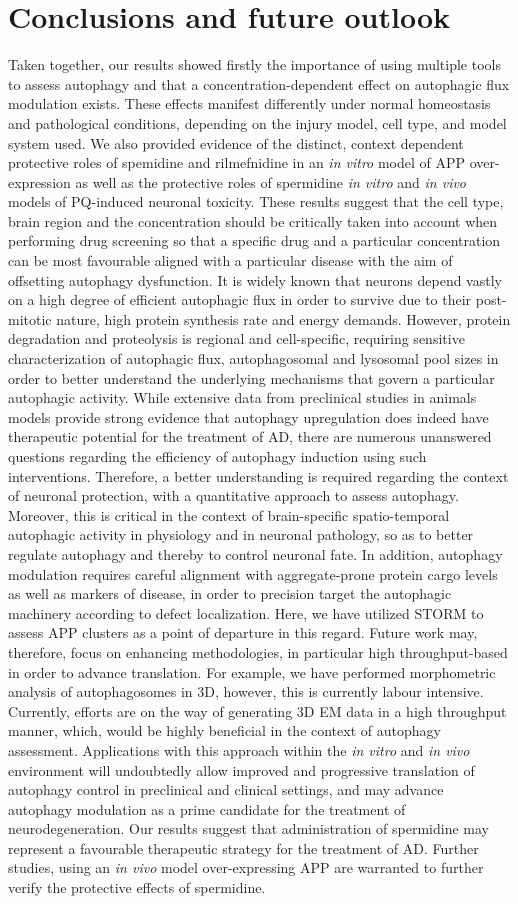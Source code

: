 \section{Conclusions and future outlook}
Taken together, our results showed firstly the importance of using multiple tools to assess autophagy and that a concentration-dependent effect on autophagic flux modulation exists. These effects manifest differently under normal homeostasis and pathological conditions, depending on the injury model, cell type, and model system used. We also provided evidence of the distinct, context dependent protective roles of spemidine and rilmefnidine in an \textit{in vitro} model of APP over-expression as well as the protective roles of spermidine \textit{in vitro} and \textit{in vivo} models of PQ-induced neuronal toxicity. These results suggest that the cell type, brain region and the concentration should be critically taken into account when performing drug screening so that a specific drug and a particular concentration can be most favourable aligned with a particular disease with the aim of offsetting autophagy dysfunction. It is widely known that neurons depend vastly on a high degree of efficient autophagic flux in order to survive due to their post-mitotic nature, high protein synthesis rate and energy demands. However, protein degradation and proteolysis is regional and cell-specific, requiring sensitive characterization of autophagic flux, autophagosomal and lysosomal pool sizes in order to better understand the underlying mechanisms that govern a particular autophagic activity. While extensive data from preclinical studies in animals models provide strong evidence that autophagy upregulation does indeed have therapeutic potential for the treatment of AD, there are numerous unanswered questions regarding the efficiency of autophagy induction using such interventions. Therefore, a better understanding is required regarding the context of neuronal protection, with a quantitative approach to assess autophagy. Moreover, this is critical in the context of brain-specific spatio-temporal autophagic activity in physiology and in neuronal pathology, so as to better regulate autophagy and thereby to control neuronal fate. In addition, autophagy modulation requires careful alignment with aggregate-prone protein cargo levels as well as markers of disease, in order to precision target the autophagic machinery according to defect localization. Here, we have utilized STORM to assess APP clusters as a point of departure in this regard. Future work may, therefore, focus on enhancing methodologies, in particular high throughput-based in order to advance translation. For example, we have performed morphometric analysis of autophagosomes in 3D, however, this is currently labour intensive. Currently, efforts are on the way of generating 3D EM data in a high throughput manner, which, would be highly beneficial in the context of autophagy assessment. Applications with this approach within the \textit{in vitro} and \textit{in vivo} environment will undoubtedly allow improved and progressive translation of autophagy control in preclinical and clinical settings, and may advance autophagy modulation as a prime candidate for the treatment of neurodegeneration. Our results suggest that administration of spermidine may represent a favourable therapeutic strategy for the treatment of AD. Further studies, using an \textit{in vivo} model over-expressing APP are warranted to further verify the protective effects of spermidine. 

